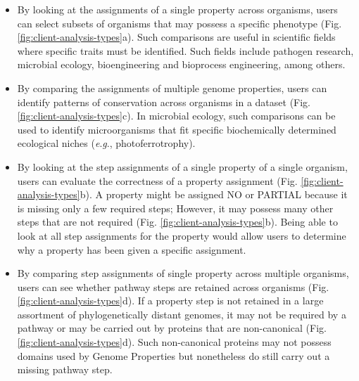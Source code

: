\begin{itemize}
\item By looking at the assignments of a single property across organisms, users 
can select subsets of organisms that may possess a specific phenotype (Fig. 
\ref{fig:client-analysis-types}a). Such comparisons are useful in scientific 
fields where specific traits must be identified. Such fields include pathogen 
research, microbial ecology, bioengineering and bioprocess engineering, among 
others.
\item By comparing the assignments of multiple genome properties, users can 
identify patterns of conservation across organisms in a dataset (Fig. 
\ref{fig:client-analysis-types}c). In microbial ecology, such comparisons can be 
used to identify microorganisms that fit specific biochemically determined 
ecological niches (\textit{e}.\textit{g}., photoferrotrophy).
\item By looking at the step assignments of a single property of a single 
organism, users can evaluate the correctness of a property assignment (Fig. 
\ref{fig:client-analysis-types}b). A property might be assigned NO or PARTIAL 
because it is missing only a few required steps; However, it may possess many 
other steps that are not required (Fig. \ref{fig:client-analysis-types}b). Being 
able to look at all step assignments for the property would allow users to 
determine why a property has been given a specific assignment.
\item By comparing step assignments of single property across multiple 
organisms, users can see whether pathway steps are retained across organisms 
(Fig. \ref{fig:client-analysis-types}d). If a property step is not retained in a 
large assortment of phylogenetically distant genomes, it may not be required by 
a pathway or may be carried out by proteins that are non-canonical (Fig. 
\ref{fig:client-analysis-types}d). Such non-canonical proteins may not possess 
domains used by Genome Properties but nonetheless do still carry out a missing 
pathway step.
\end{itemize}

